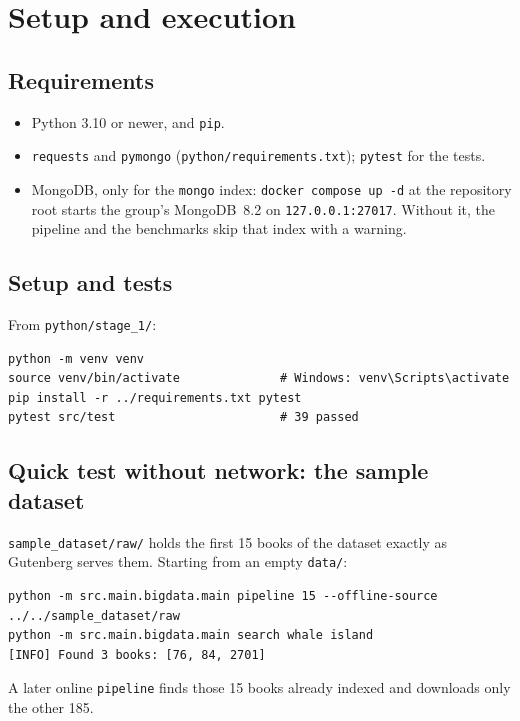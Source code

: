 \documentclass[11pt,a4paper]{article}
\newcommand{\code}[1]{\texttt{#1}}
\begin{document}
\section{Setup and execution}

\subsection{Requirements}
\begin{itemize}
  \item Python 3.10 or newer, and \code{pip}.
  \item \code{requests} and \code{pymongo} (\code{python/requirements.txt}); \code{pytest} for the tests.
  \item MongoDB, only for the \code{mongo} index: \code{docker compose up -d} at the repository root
        starts the group's MongoDB~8.2 on \code{127.0.0.1:27017}. Without it, the pipeline and the
        benchmarks skip that index with a warning.
\end{itemize}

\subsection{Setup and tests}
From \code{python/stage\_1/}:
\begin{lstlisting}[style=shell]
python -m venv venv
source venv/bin/activate              # Windows: venv\Scripts\activate
pip install -r ../requirements.txt pytest
pytest src/test                       # 39 passed
\end{lstlisting}

\subsection{Quick test without network: the sample dataset}\label{sec:quick}
\code{sample\_dataset/raw/} holds the first 15 books of the dataset exactly as Gutenberg serves
them. Starting from an empty \code{data/}:
\begin{lstlisting}[style=shell]
python -m src.main.bigdata.main pipeline 15 --offline-source ../../sample_dataset/raw
python -m src.main.bigdata.main search whale island
[INFO] Found 3 books: [76, 84, 2701]
\end{lstlisting}
A later online \code{pipeline} finds those 15 books already indexed and downloads only the other 185.
\end{document}
